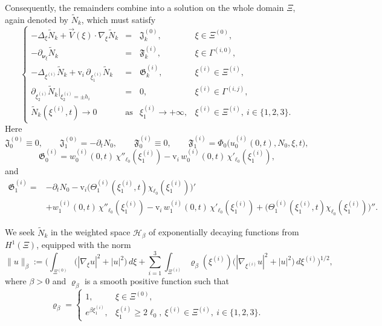 \documentclass[reqno]{amsart}            %
\numberwithin{equation}{section}
\begin{document}
	Consequently, the remainders combine into a solution on the whole domain $\Xi$, again denoted by $\widetilde{N}_k$, which must satisfy
	\begin{equation}\label{N_k_prob}
		\left\{
		\begin{array}{rcll}
			- \Delta_\xi \widetilde{N}_k + \overrightarrow{V}(\xi)\cdot\nabla_\xi \widetilde{N}_k
			&=& \mathfrak{J}^{(0)}_k, & \xi\in\Xi^{(0)},
			\\[2mm]
			-\partial_{\boldsymbol{\nu}_\xi}\widetilde{N}_k
			&=& \mathfrak{F}^{(i)}_k, & \xi\in\Gamma^{(i,0)},
			\\[2mm]
			- \Delta_{\xi^{(i)}}\widetilde{N}_k
			+ \mathrm{v}_i\,\partial_{\xi^{(i)}_1}\widetilde{N}_k
			&=& \mathfrak{G}^{(i)}_k, & \xi^{(i)}\in\Xi^{(i)},
			\\[2mm]
			\partial_{\xi^{(i)}_2}\widetilde{N}_k\big|_{\xi^{(i)}_2=\pm h_i}
			&=& 0, & \xi^{(i)}\in\Gamma^{(i,j)},
			\\[2mm]
			\widetilde{N}_k(\xi^{(i)},t)\longrightarrow0
			&\text{as}& \xi^{(i)}_1\to+\infty, & \xi^{(i)}\in\Xi^{(i)},\ i\in\{1,2,3\}.
		\end{array}
		\right.
	\end{equation}
	Here
	\[
	\mathfrak{J}^{(0)}_0\equiv0,\qquad
	\mathfrak{J}^{(0)}_1=-\partial_t N_0,
	\qquad
	\mathfrak{F}^{(i)}_0\equiv0,\qquad
	\mathfrak{F}^{(i)}_1=\Phi_0\big(u^{(i)}_0(0,t),N_0,\xi,t\big),
	\]
	\[
	\mathfrak{G}^{(i)}_0
	= w^{(i)}_0(0,t)\,\chi''_{\ell_0}(\xi^{(i)}_1)
	- \mathrm{v}_i\,w^{(i)}_0(0,t)\,\chi'_{\ell_0}(\xi^{(i)}_1),
	\]
	and
	\begin{align*}
		\mathfrak{G}^{(i)}_1
		= & -\partial_t N_0
		- \mathrm{v}_i\big(\Theta^{(i)}_1(\xi^{(i)}_1,t)\chi_{\ell_0}(\xi^{(i)}_1)\big)'
		\\
		& + w^{(i)}_1(0,t)\,\chi''_{\ell_0}(\xi^{(i)}_1)
		- \mathrm{v}_i\,w^{(i)}_1(0,t)\,\chi'_{\ell_0}(\xi^{(i)}_1)
		+ \big(\Theta^{(i)}_1(\xi^{(i)}_1,t)\chi_{\ell_0}(\xi^{(i)}_1)\big)''.
	\end{align*}
	
	We seek $\widetilde{N}_k$ in the weighted space $\mathcal{H}_\beta$ of
	exponentially decaying functions from $H^1(\Xi)$, equipped with the norm
	\[
	\|u\|_{\beta}
	:=\Bigg(
	\int_{\Xi^{(0)}}\big(|\nabla_\xi u|^2+|u|^2\big)\,d\xi
	+\sum_{i=1}^3\int_{\Xi^{(i)}}\varrho_\beta(\xi^{(i)})
	\big(|\nabla_{\xi^{(i)}}u|^2+|u|^2\big)\,d\xi^{(i)}
	\Bigg)^{1/2},
	\]
	where $\beta>0$ and $\varrho_\beta$ is a smooth positive function such that
	\[
	\varrho_\beta =
	\begin{cases}
		1, & \xi\in\Xi^{(0)},
		\\[2pt]
		e^{\beta\xi^{(i)}_1}, & \xi^{(i)}_1\ge2\ell_0,\ \xi^{(i)}\in\Xi^{(i)},\ i\in\{1,2,3\}.
	\end{cases}
	\]
	
\end{document}
